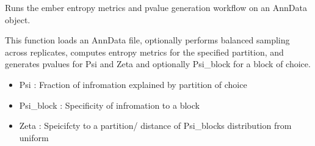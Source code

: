 \documentclass[letterpaper,10pt,english]{sphinxmanual}
\begin{document}
\begin{fulllineitems}
\label{\detokenize{ember_py:ember_py.light_ember.light_ember}}
\pysigstartsignatures
\pysiglinewithargsret
{}
{\sphinxparamcomma {}\sphinxparamcomma {}\sphinxparamcomma {}\sphinxparamcomma {}\sphinxparamcomma {}\sphinxparamcomma {}\sphinxparamcomma {}\sphinxparamcomma {}\sphinxparamcomma {}\sphinxparamcomma {}\sphinxparamcomma {}\sphinxparamcomma {}\sphinxparamcomma {}\sphinxparamcomma {}}
{}
\pysigstopsignatures
\sphinxAtStartPar
Runs the ember entropy metrics and p\sphinxhyphen{}value generation workflow on an AnnData object.

\sphinxAtStartPar
This function loads an AnnData  file, optionally performs balanced sampling
across replicates, computes entropy metrics for the specified partition,
and generates p\sphinxhyphen{}values for Psi and Zeta and optionally Psi\_block for a block of choice.
\begin{description}
\begin{itemize}
\item {} 
\sphinxAtStartPar
Psi : Fraction of infromation explained by partition of choice

\item {} 
\sphinxAtStartPar
Psi\_block : Specificity of infromation to a block

\item {} 
\sphinxAtStartPar
Zeta : Speicifcty to a partition/ distance of Psi\_blocks distribution from uniform


\end{itemize}
\end{description}
\end{fulllineitems}
\end{document}

